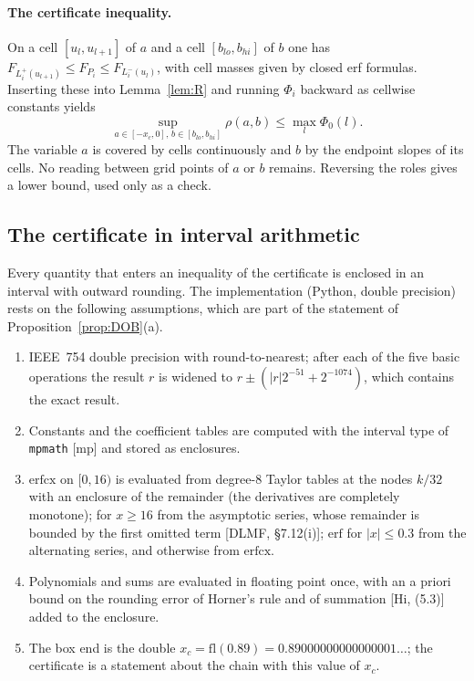 \documentclass[11pt,a4paper]{article}
\theoremstyle{definition}
\theoremstyle{remark}
\newcommand{\xc}{x_c}
\newcommand{\code}[1]{\texttt{#1}}
\begin{document}
\paragraph{The certificate inequality.} On a cell $[u_l,u_{l+1}]$ of $a$ and a cell $[b_{lo},b_{hi}]$ of $b$ one has $F_{L^+_i(u_{l+1})}\le F_{P_i}\le F_{L^-_i(u_l)}$, with cell masses given by closed erf formulas. Inserting these into Lemma~\ref{lem:R} and running $\Phi_i$ backward as cellwise constants yields
\[
\sup_{a\in[-\xc,0],\,b\in[b_{lo},b_{hi}]}\rho(a,b)\le\max_l\Phi_0(l).
\]
The variable $a$ is covered by cells continuously and $b$ by the endpoint slopes of its cells. No reading between grid points of $a$ or $b$ remains. Reversing the roles gives a lower bound, used only as a check.

\subsection{The certificate in interval arithmetic}\label{sec:discipline}
Every quantity that enters an inequality of the certificate is enclosed in an interval with outward rounding. The implementation (Python, double precision) rests on the following assumptions, which are part of the statement of Proposition~\ref{prop:DOB}(a).
\begin{enumerate}[leftmargin=*,label=(A\arabic*)]
\item IEEE~754 double precision with round-to-nearest; after each of the five basic operations the result $r$ is widened to $r\pm(|r|2^{-51}+2^{-1074})$, which contains the exact result.
\item Constants and the coefficient tables are computed with the interval type of \code{mpmath} [mp] and stored as enclosures.
\item $\mathrm{erfcx}$ on $[0,16)$ is evaluated from degree-$8$ Taylor tables at the nodes $k/32$ with an enclosure of the remainder (the derivatives are completely monotone); for $x\ge16$ from the asymptotic series, whose remainder is bounded by the first omitted term [DLMF, \S7.12(i)]; $\mathrm{erf}$ for $|x|\le0.3$ from the alternating series, and otherwise from $\mathrm{erfcx}$.
\item Polynomials and sums are evaluated in floating point once, with an a priori bound on the rounding error of Horner's rule and of summation [Hi, (5.3)] added to the enclosure.
\item The box end is the double $\xc=\mathrm{fl}(0.89)=0.89000000000000001\ldots$; the certificate is a statement about the chain with this value of $\xc$.
\end{enumerate}
\end{document}

